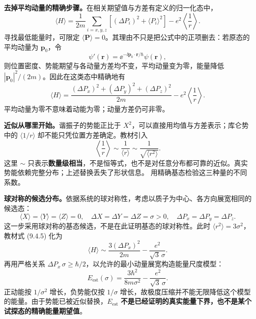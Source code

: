 \textbf{去掉平均动量的精确步骤。}在相关期望值与方差有定义的归一化态中，
\begin{equation}
  \langle H\rangle=\frac1{2m}\sum_{i=x,y,z}
   \left[(\Delta P_i)^2+\langle P_i\rangle^2\right]
   -e^2\left\langle\frac1r\right\rangle.
\end{equation}
寻找最低能量时，可限定 $\langle\mathbf P\rangle=0$。其理由不只是把公式中的正项删去：若原态的平均动量为 $\mathbf p_0$，令
\begin{equation}
  \psi'(\mathbf r)=\ee^{-\ii\mathbf p_0\cdot\mathbf r/\hbar}\psi(\mathbf r),
\end{equation}
则位置密度、势能期望与各动量方差均不变，平均动量变为零，能量降低 $|\mathbf p_0|^2/(2m)$。因此在这类态中精确地有
\begin{equation}
  \boxed{\langle H\rangle=
    \frac{(\Delta P_x)^2+(\Delta P_y)^2+(\Delta P_z)^2}{2m}
    -e^2\left\langle\frac1r\right\rangle}.
\end{equation}
平均动量为零不意味着动能为零；动量方差仍可非零。

\textbf{近似从哪里开始。}谐振子的势能正比于 $X^2$，可以直接用均值与方差表示；库仑势中的 $\langle1/r\rangle$ 却不能只凭位置方差确定。教材引入
\begin{equation}
  \left\langle\frac1r\right\rangle
   \sim\frac1{\langle r\rangle}
   \sim\frac1{\sqrt{\langle r^2\rangle}}.
  \label{eq:QM-C09-S04-scale-replacement}
\end{equation}
这里 $\sim$ 只表示\textbf{数量级相当}，不是恒等式，也不是对任意分布都可靠的近似。真实势能依赖完整分布；上述替换丢失了形状信息。 用精确基态检验这三种量的不同系数。

\textbf{球对称的候选分布。}依据系统的球对称性，考虑以质子为中心、各方向展宽相同的候选态：
\begin{equation}
  \langle X\rangle=\langle Y\rangle=\langle Z\rangle=0,
  \quad \Delta X=\Delta Y=\Delta Z=\sigma>0,
  \quad \Delta P_x=\Delta P_y=\Delta P_z.
\end{equation}
这一步采用球对称的基态候选，不是在此证明基态的球对称性。此时 $\langle r^2\rangle=3\sigma^2$，教材式 (9.4.5) 化为
\begin{equation}
  \langle H\rangle\sim\frac{3(\Delta P_x)^2}{2m}
      -\frac{e^2}{\sqrt3\,\sigma}.
\end{equation}
再用严格关系 $\Delta P_x\,\sigma\ge\hbar/2$，以允许的最小动量展宽构造能量尺度模型：
\begin{equation}
  \boxed{E_{\mathrm{est}}(\sigma)=\frac{3\hbar^2}{8m\sigma^2}
     -\frac{e^2}{\sqrt3\,\sigma}}.
  \label{eq:QM-C09-S04-energy-model}
\end{equation}
正动能按 $1/\sigma^2$ 增长，负势能仅按 $1/\sigma$ 增长，故极度压缩并不能无限降低这个模型的能量。由于势能已被近似替换，$E_{\mathrm{est}}$ \textbf{不是已经证明的真实能量下界，也不是某个试探态的精确能量期望值}。

